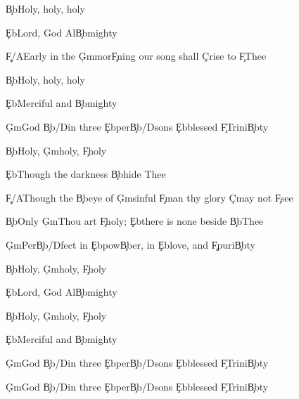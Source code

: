 \documentclass[9pt]{extarticle}
\begin{document}
\bsong

\bv
\c{Bb}Holy, holy, holy

\c{Eb}Lord, God Al\c{Bb}mighty

\c{F/A}Early in the \c{Gm}mor\c{F}ning our song shall \c{C}rise to \c{F}Thee

\c{Bb}Holy, holy, holy

\c{Eb}Merciful and \c{Bb}mighty

\c{Gm}God \c{Bb/D}in three \c{Eb}per\c{Bb/D}sons \c{Eb}blessed \c{F}Trini\c{Bb}ty
\ev

\bv
\c{Bb}Holy, \c{Gm}holy, \c{F}holy

\c{Eb}Though the darkness \c{Bb}hide Thee

\c{F/A}Though the \c{Bb}eye of \c{Gm}sinful \c{F}man thy glory \c{C}may not \c{F}see

\c{Bb}Only \c{Gm}Thou art \c{F}holy; \c{Eb}there is none beside \c{Bb}Thee

\c{Gm}Per\c{Bb/D}fect in \c{Eb}pow\c{Bb}er, in \c{Eb}love, and \c{F}puri\c{Bb}ty
\ev

\bv
\c{Bb}Holy, \c{Gm}holy, \c{F}holy

\c{Eb}Lord, God Al\c{Bb}mighty


\c{Bb}Holy, \c{Gm}holy, \c{F}holy

\c{Eb}Merciful and \c{Bb}mighty

\c{Gm}God \c{Bb/D}in three \c{Eb}per\c{Bb/D}sons \c{Eb}blessed \c{F}Trini\c{Bb}ty
\ev

\bo
\c{Gm}God \c{Bb/D}in three \c{Eb}per\c{Bb/D}sons \c{Eb}blessed \c{F}Trini\c{Bb}ty
\eo

\esong
\end{document}
